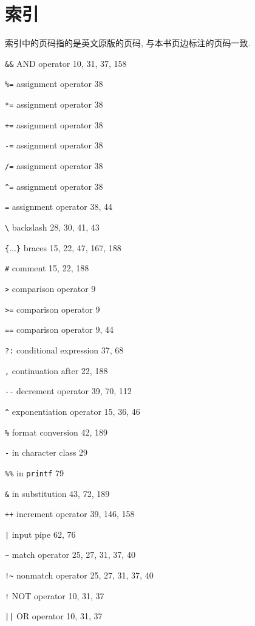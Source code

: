 \chapter{索引}
\label{chap:index}

索引中的页码指的是英文原版的页码, 与本书页边标注的页码一致.

\begin{multicols}{2}

\verb'&&' AND operator 10, 31, 37, 158

\verb'%=' assignment operator 38

\verb'*=' assignment operator 38 

\verb'+=' assignment operator 38

\verb'-=' assignment operator 38

\verb'/=' assignment operator 38

\verb'^=' assignment operator 38 

\verb'=' assignment operator 38, 44

\verb'\' backslash 28, 30, 41, 43

\verb'{'...\verb'}' braces 15, 22, 47, 167, 188

\verb'#' comment 15, 22, 188 

\verb'>' comparison operator 9

\verb'>=' comparison operator 9

\verb'==' comparison operator 9, 44 

\verb'?:' conditional expression 37, 68 

\verb',' continuation after 22, 188 

\verb'--' decrement operator 39, 70, 112

\verb'^' exponentiation operator 15, 36, 46

\verb'%' format conversion 42, 189

\verb'-' in character class 29

\verb'%%' in \verb'printf' 79

\verb'&' in substitution 43, 72, 189

\verb'++' increment operator 39, 146, 158

\verb'|' input pipe 62, 76

\verb'~' match operator 25, 27, 31, 37, 40 

\verb'!~' nonmatch operator 25, 27, 31, 37, 40

\verb'!' NOT operator 10, 31, 37

\verb'||' OR operator 10, 31, 37 


\end{multicols}
